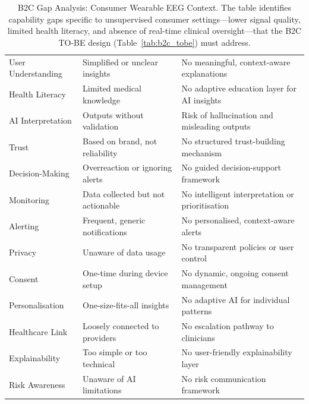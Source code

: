 {\tablestripes\tablefontsize

\begin{xltabular}{\textwidth}{@{} >{\raggedright\arraybackslash}p{3.2cm} L L @{}}
\caption[B2C Gap Analysis: Consumer Wearable EEG Context]{B2C Gap Analysis: Consumer Wearable EEG Context. The table identifies capability gaps specific to unsupervised consumer settings---lower signal quality, limited health literacy, and absence of real-time clinical oversight---that the B2C TO-BE design (Table~\ref{tab:b2c_tobe}) must address.}\label{tab:b2c_gap} \\
\toprule
{} &  &  \\
\midrule
\endfirsthead
\endhead
\bottomrule
\endlastfoot
User Understanding & Simplified or unclear insights & No meaningful, context-aware explanations \\
\addlinespace
Health Literacy & Limited medical knowledge & No adaptive education layer for AI insights \\
\addlinespace
AI Interpretation & Outputs without validation & Risk of hallucination and misleading outputs \\
\addlinespace
Trust & Based on brand, not reliability & No structured trust-building mechanism \\
\addlinespace
Decision-Making & Overreaction or ignoring alerts & No guided decision-support framework \\
\addlinespace
Monitoring & Data collected but not actionable & No intelligent interpretation or prioritisation \\
\addlinespace
Alerting & Frequent, generic notifications & No personalised, context-aware alerts \\
\addlinespace
Privacy & Unaware of data usage & No transparent policies or user control \\
\addlinespace
Consent & One-time during device setup & No dynamic, ongoing consent management \\
\addlinespace
Personalisation & One-size-fits-all insights & No adaptive AI for individual patterns \\
\addlinespace
Healthcare Link & Loosely connected to providers & No escalation pathway to clinicians \\
\addlinespace
Explainability & Too simple or too technical & No user-friendly explainability layer \\
\addlinespace
Risk Awareness & Unaware of AI limitations & No risk communication framework \\

\end{xltabular}}
